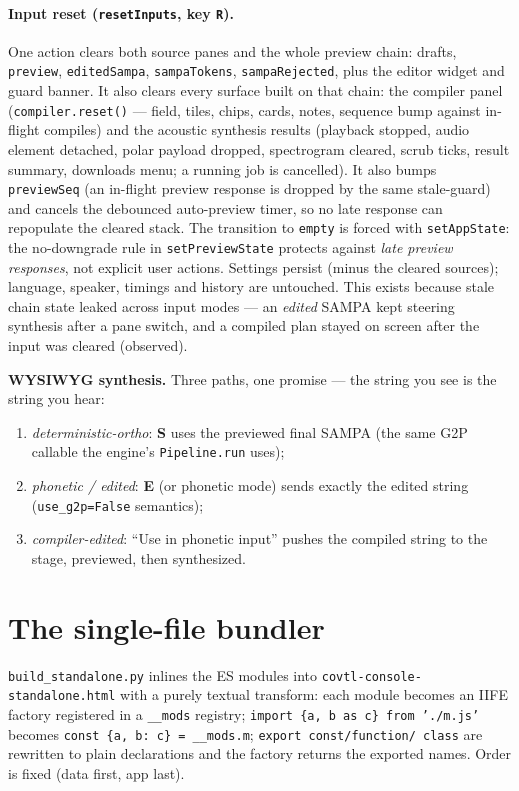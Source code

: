 \documentclass[11pt,a4paper]{article}
\newcommand{\key}[1]{\textbf{#1}}
\begin{document}
\paragraph{Input reset (\texttt{resetInputs}, key \texttt{R}).} One
action clears both source panes and the whole preview chain: drafts,
\texttt{preview}, \texttt{editedSampa}, \texttt{sampaTokens},
\texttt{sampaRejected}, plus the editor widget and guard banner. It
also clears every surface built on that chain: the compiler panel
(\texttt{compiler.reset()} --- field, tiles, chips, cards, notes,
sequence bump against in-flight compiles) and the acoustic synthesis
results (playback stopped, audio element detached, polar payload
dropped, spectrogram cleared, scrub ticks, result summary, downloads
menu; a running job is cancelled). It also bumps
\texttt{previewSeq} (an in-flight preview response is dropped by
the same stale-guard) and cancels the debounced auto-preview timer, so
no late response can repopulate the cleared stack. The transition to
\texttt{empty} is forced with \texttt{setAppState}: the
no-downgrade rule in \texttt{setPreviewState} protects against
\emph{late preview responses}, not explicit user actions. Settings
persist (minus the cleared sources); language, speaker, timings and
history are untouched. This exists because stale chain state leaked
across input modes --- an \emph{edited} SAMPA kept steering synthesis
after a pane switch, and a compiled plan stayed on screen after the
input was cleared (observed).

\textbf{WYSIWYG synthesis.} Three paths, one promise --- the string you
see is the string you hear:
\begin{enumerate}
\item \emph{deterministic-ortho}: \key{S} uses the previewed final SAMPA
  (the same G2P callable the engine's \texttt{Pipeline.run} uses);
\item \emph{phonetic / edited}: \key{E} (or phonetic mode) sends exactly
  the edited string (\texttt{use\_g2p=False} semantics);
\item \emph{compiler-edited}: ``Use in phonetic input'' pushes the
  compiled string to the stage, previewed, then synthesized.
\end{enumerate}

\section{The single-file bundler}

\texttt{build\_standalone.py} inlines the ES modules into
\texttt{covtl-console-standalone.html} with a purely textual transform:
each module becomes an IIFE factory registered in a \texttt{\_\_mods}
registry; \texttt{import \{a, b as c\} from './m.js'} becomes
\texttt{const \{a, b: c\} = \_\_mods.m}; \texttt{export const/function/
class} are rewritten to plain declarations and the factory returns the
exported names. Order is fixed (data first, app last).
\end{document}
